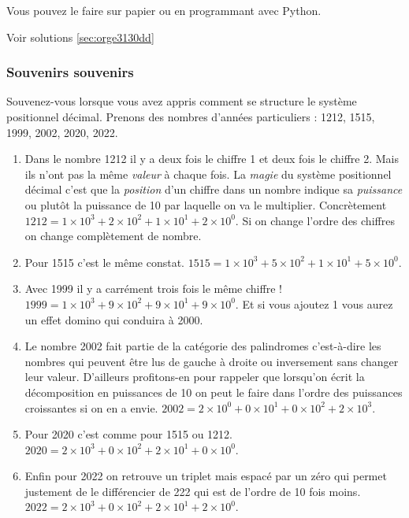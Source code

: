 \documentclass[a4paper, 11pt, twoside]{article}
\begin{document}
Vous pouvez le faire sur papier ou en programmant avec Python.

Voir solutions \ref{sec:orge3130dd}

\subsubsection{Souvenirs souvenirs}
\label{sec:org1c35dde}

Souvenez-vous lorsque vous avez appris comment se structure le
système positionnel décimal. Prenons des nombres d'années
particuliers : 1212, 1515, 1999, 2002, 2020, 2022.

\begin{enumerate}
\item Dans le nombre 1212 il y a deux fois le chiffre 1 et deux fois
le chiffre 2. Mais ils n'ont pas la même \emph{valeur} à chaque
fois. La \emph{magie} du système positionnel décimal c'est que la
\emph{position} d'un chiffre dans un nombre indique sa \emph{puissance}
ou plutôt la puissance de 10 par laquelle on va le
multiplier. Concrètement \(1212 = 1\times 10^3 + 2\times 10^2 +
       1\times 10^1 + 2\times 10^0\). Si on change l'ordre des chiffres
on change complètement de nombre.
\item Pour 1515 c'est le même constat. \(1515 = 1\times 10^3 + 5\times
       10^2 + 1\times 10^1 + 5\times 10^0\).
\item Avec 1999 il y a carrément trois fois le même chiffre ! \(1999 =
       1\times 10^3 + 9\times 10^2 + 9\times 10^1 + 9\times 10^0\). Et
si vous ajoutez 1 vous aurez un effet domino qui conduira
à 2000.
\item Le nombre 2002 fait partie de la catégorie des palindromes
c'est-à-dire les nombres qui peuvent être lus de gauche à
droite ou inversement sans changer leur valeur. D'ailleurs
profitons-en pour rappeler que lorsqu'on écrit la décomposition
en puissances de 10 on peut le faire dans l'ordre des
puissances croissantes si on en a envie. \(2002 = 2\times 10^0 +
       0\times 10^1 + 0\times 10^2 + 2\times 10^3\).
\item Pour 2020 c'est comme pour 1515 ou 1212. \(2020 = 2\times 10^3 +
       0\times 10^2 + 2\times 10^1 + 0\times 10^0\).
\item Enfin pour 2022 on retrouve un triplet mais espacé par un zéro
qui permet justement de le différencier de 222 qui est de
l'ordre de 10 fois moins. \(2022 = 2\times 10^3 + 0\times 10^2 +
       2\times 10^1 + 2\times 10^0\).
\end{enumerate}
\end{document}
